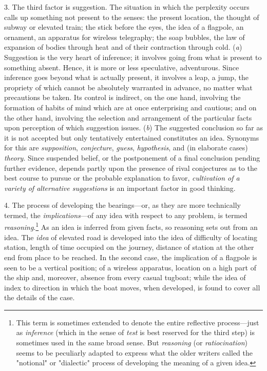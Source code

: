 \documentclass[letterpaper]{book}
\begin{document}
3. The third factor is suggestion. The situation
in
which the perplexity occurs calls up something not present to the
senses: the present location, the thought of subway or elevated train;
the stick before the eyes, the idea of a flagpole, an ornament, an
apparatus for wireless telegraphy; the soap bubbles, the law of
expansion of bodies through heat and of their contraction through cold.
(\emph{a}) Suggestion is the very heart of inference; it involves going
from what is present to something absent. Hence, it is more or less
speculative, adventurous. Since inference goes beyond what is actually
present, it involves a leap, a jump, the propriety of which cannot be
absolutely warranted in advance, no matter what precautions be taken.
Its control is indirect, on the one hand, involving the formation of
habits of mind which are at once enterprising and cautious; and on the
other hand, involving the selection and arrangement of the particular
facts upon perception of which suggestion issues. (\emph{b}) The
suggested conclusion so far as it is not accepted but only tentatively
entertained constitutes an idea. Synonyms for this are
\emph{supposition}, \emph{conjecture}, \emph{guess}, \emph{hypothesis},
and (in elaborate cases) \emph{theory}. Since suspended belief, or the
postponement of a final conclusion pending further evidence, depends
partly upon the presence of rival conjectures as to the best course to
pursue or the probable explanation to favor, \emph{cultivation of a
variety of alternative suggestions} is an important factor in good
thinking.


4. The process of developing the bearings---or, as they are more
technically termed, the \emph{implications}---of any idea with respect
to any problem, is termed
\emph{reasoning}.\footnote{
This term is sometimes extended to denote the entire reflective
process---just as \emph{inference} (which in the sense of \emph{test} is
best reserved for the third step) is sometimes used in the same broad
sense. But \emph{reasoning} (or \emph{ratiocination}) seems to be
peculiarly adapted to express what the older writers called the
"notional" or "dialectic" process of developing the meaning of a given
idea.
}
As an idea is inferred from given facts, so
reasoning
sets out from an idea. The \emph{idea} of elevated road is developed
into the idea of difficulty of locating station, length of time occupied
on the journey, distance of station at the other end from place to be
reached. In the second case, the implication of a flagpole is seen to be
a vertical position; of a wireless apparatus, location on a high part of
the ship and, moreover, absence from every casual tugboat; while the
idea of index to direction in which the boat moves, when developed, is
found to cover all the details of the case.
\end{document}
